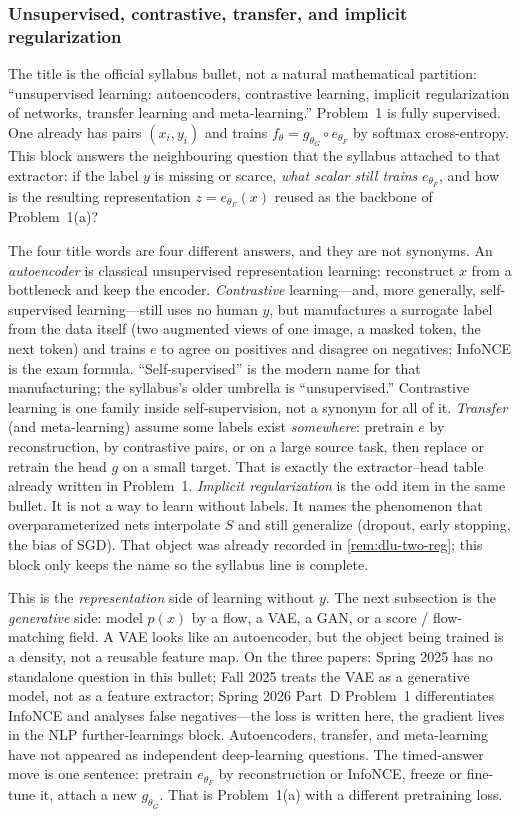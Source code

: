 \subsubsection{Unsupervised, contrastive, transfer, and implicit regularization}
\label{subsubsec:dlu-unsup}

The title is the official syllabus bullet, not a natural mathematical partition: ``unsupervised learning: autoencoders, contrastive learning, implicit regularization of networks, transfer learning and meta-learning.'' Problem~1 is fully supervised. One already has pairs \((x_i,y_i)\) and trains \(f_\theta=g_{\theta_G}\circ e_{\theta_F}\) by softmax cross-entropy. This block answers the neighbouring question that the syllabus attached to that extractor: if the label \(y\) is missing or scarce, \emph{what scalar still trains} \(e_{\theta_F}\), and how is the resulting representation \(z=e_{\theta_F}(x)\) reused as the backbone of Problem~1(a)?

The four title words are four different answers, and they are not synonyms. An \emph{autoencoder} is classical unsupervised representation learning: reconstruct \(x\) from a bottleneck and keep the encoder. \emph{Contrastive} learning---and, more generally, self-supervised learning---still uses no human \(y\), but manufactures a surrogate label from the data itself (two augmented views of one image, a masked token, the next token) and trains \(e\) to agree on positives and disagree on negatives; InfoNCE is the exam formula. ``Self-supervised'' is the modern name for that manufacturing; the syllabus's older umbrella is ``unsupervised.'' Contrastive learning is one family inside self-supervision, not a synonym for all of it. \emph{Transfer} (and meta-learning) assume some labels exist \emph{somewhere}: pretrain \(e\) by reconstruction, by contrastive pairs, or on a large source task, then replace or retrain the head \(g\) on a small target. That is exactly the extractor--head table already written in Problem~1. \emph{Implicit regularization} is the odd item in the same bullet. It is not a way to learn without labels. It names the phenomenon that overparameterized nets interpolate \(S\) and still generalize (dropout, early stopping, the bias of SGD). That object was already recorded in \cref{rem:dlu-two-reg}; this block only keeps the name so the syllabus line is complete.

This is the \emph{representation} side of learning without \(y\). The next subsection is the \emph{generative} side: model \(p(x)\) by a flow, a VAE, a GAN, or a score / flow-matching field. A VAE looks like an autoencoder, but the object being trained is a density, not a reusable feature map. On the three papers: Spring 2025 has no standalone question in this bullet; Fall 2025 treats the VAE as a generative model, not as a feature extractor; Spring 2026 Part~D Problem~1 differentiates InfoNCE and analyses false negatives---the loss is written here, the gradient lives in the NLP further-learnings block. Autoencoders, transfer, and meta-learning have not appeared as independent deep-learning questions. The timed-answer move is one sentence: pretrain \(e_{\theta_F}\) by reconstruction or InfoNCE, freeze or fine-tune it, attach a new \(g_{\theta_G}\). That is Problem~1(a) with a different pretraining loss.

